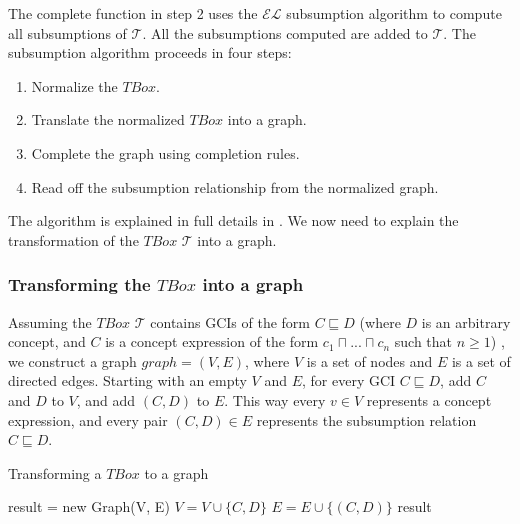 \documentclass{sfuthesis}
\theoremstyle{plain}
\theoremstyle{definition}
\begin{document}
The complete function in step 2 uses the $\mathcal{EL}$ subsumption algorithm to compute all subsumptions of $\mathcal{T}$. All the subsumptions computed are added to $\mathcal{T}$. The subsumption algorithm proceeds in four steps:\cite{new}
\begin{enumerate}
\item Normalize the $TBox$.
\item Translate the normalized $TBox$ into a graph.
\item Complete the graph using completion rules.
\item Read off the subsumption relationship from the normalized graph.
\end{enumerate}
The algorithm is explained in full details in \cite{new}. We now need to explain the transformation of the $TBox$ $\mathcal{T}$ into a graph.

\subsubsection{Transforming the $TBox$ into a graph}
Assuming the $TBox$ $\mathcal{T}$ contains GCIs of the form $C \sqsubseteq D$ (where $D$ is an arbitrary concept, and $C$ is a concept expression of the form $c_1 \sqcap ... \sqcap c_n$ such that $n \geq 1$) , we construct a graph $graph=(V, E)$, where $V$ is a set of nodes and $E$ is a set of directed edges. Starting with an empty $V$ and $E$, for every GCI $C \sqsubseteq D$, add $C$ and $D$ to $V$, and add $(C, D)$ to $E$. This way every $v \in V$ represents a concept expression, and every pair $(C, D) \in E$ represents the subsumption relation $C \sqsubseteq D$.

\begin{algorithm}
\caption{Transforming a $TBox$ to a graph}
\label{Transformation}
\begin{algorithmic}[1]
\State result = new Graph(V, E)
\State $V = V \cup \{C, D\}$
\State $E = E \cup \{(C, D)\}$
\EndFor
\State \Return result
\EndFunction
\end{algorithmic}
\end{algorithm}
\end{document}
